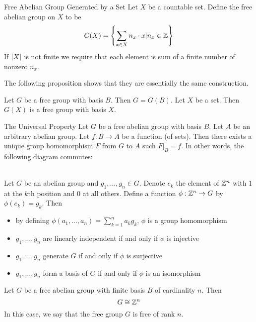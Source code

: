 \documentclass[a4paper]{article}
\begin{document}
\begin{defn}{Free Abelian Group Generated by a Set}{} Let $X$ be a countable set. Define the free abelian group on $X$ to be $$G(X)=\left\{\sum_{x\in X}n_x\cdot x|n_x\in\mathbb{Z}\right\}$$ If $\abs{X}$ is not finite we require that each element is sum of a finite number of nonzero $n_x$. 
\end{defn}

The following proposition shows that they are essentially the same construction. 

\begin{prp}{}{} Let $G$ be a free group with basis $B$. Then $G=G(B)$. Let $X$ be a set. Then $G(X)$ is a free group with basis $X$. 
\end{prp}

\begin{thm}{The Universal Property}{} Let $G$ be a free abelian group with basis $B$. Let $A$ be an arbitrary abelian group. Let $f:B\to A$ be a function (of sets). Then there exists a unique group homomorphism $F$ from $G$ to $A$ such $F|_B=f$. In other words, the following diagram commutes: \\~\\
\end{thm}

\begin{prp}{}{} Let $G$ be an abelian group and $g_1,\dots,g_n\in G$. Denote $e_k$ the element of $\mathbb{Z}^n$ with $1$ at the $k$th position and $0$ at all others. Define a function $\phi:\mathbb{Z}^n\to G$ by $\phi(e_k)=g_k$. Then
\begin{itemize}
\item by defining $\phi(a_1,\dots,a_n)=\sum_{k=1}^na_kg_k$, $\phi$ is a group homomorphism
\item $g_1,\dots,g_n$ are linearly independent if and only if $\phi$ is injective
\item $g_1,\dots,g_n$ generate $G$ if and only if $\phi$ is surjective
\item $g_1,\dots,g_n$ form a basis of $G$ if and only if $\phi$ is an isomorphism
\end{itemize}
\end{prp}

\begin{prp}{}{} Let $G$ be a free abelian group with finite basis $B$ of cardinality $n$. Then $$G\cong\mathbb{Z}^n$$ In this case, we say that the free group $G$ is free of rank $n$. 
\end{prp}
\end{document}
